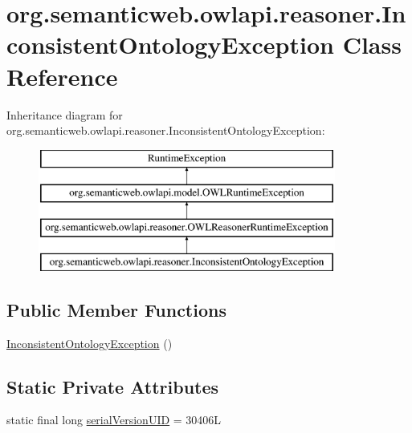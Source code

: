 \hypertarget{classorg_1_1semanticweb_1_1owlapi_1_1reasoner_1_1_inconsistent_ontology_exception}{\section{org.\-semanticweb.\-owlapi.\-reasoner.\-Inconsistent\-Ontology\-Exception Class Reference}
\label{classorg_1_1semanticweb_1_1owlapi_1_1reasoner_1_1_inconsistent_ontology_exception}
}
Inheritance diagram for org.\-semanticweb.\-owlapi.\-reasoner.\-Inconsistent\-Ontology\-Exception\-:\begin{figure}[H]
\begin{center}
\leavevmode
\includegraphics[height=4.000000cm]{classorg_1_1semanticweb_1_1owlapi_1_1reasoner_1_1_inconsistent_ontology_exception}
\end{center}
\end{figure}
\subsection*{Public Member Functions}
\begin{DoxyCompactItemize}
\item 
\hyperlink{classorg_1_1semanticweb_1_1owlapi_1_1reasoner_1_1_inconsistent_ontology_exception_ad38a40da3d66e60706d52dd937499639}{Inconsistent\-Ontology\-Exception} ()
\end{DoxyCompactItemize}
\subsection*{Static Private Attributes}
\begin{DoxyCompactItemize}
\item 
static final long \hyperlink{classorg_1_1semanticweb_1_1owlapi_1_1reasoner_1_1_inconsistent_ontology_exception_af0892b5d45044dd496adc5b912d9517e}{serial\-Version\-U\-I\-D} = 30406\-L
\end{DoxyCompactItemize}


